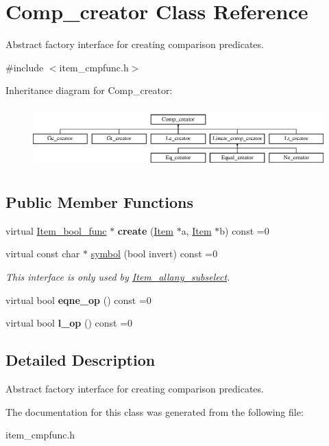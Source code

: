 \hypertarget{classComp__creator}{}\section{Comp\+\_\+creator Class Reference}
\label{classComp__creator}


Abstract factory interface for creating comparison predicates.  




{\ttfamily \#include $<$item\+\_\+cmpfunc.\+h$>$}

Inheritance diagram for Comp\+\_\+creator\+:\begin{figure}[H]
\begin{center}
\leavevmode
\includegraphics[height=2.382979cm]{classComp__creator}
\end{center}
\end{figure}
\subsection*{Public Member Functions}
\begin{DoxyCompactItemize}
\item 
\mbox{\label{classComp__creator_acb61e20da689aa1dde501a3748f96f61}} 
virtual \mbox{\hyperlink{classItem__bool__func}{Item\+\_\+bool\+\_\+func}} $\ast$ {\bfseries create} (\mbox{\hyperlink{classItem}{Item}} $\ast$a, \mbox{\hyperlink{classItem}{Item}} $\ast$b) const =0
\item 
\mbox{\label{classComp__creator_af037da69fa5142d6e70dafeea00da99f}} 
virtual const char $\ast$ \mbox{\hyperlink{classComp__creator_af037da69fa5142d6e70dafeea00da99f}{symbol}} (bool invert) const =0
\begin{DoxyCompactList}\small\item\em This interface is only used by \mbox{\hyperlink{classItem__allany__subselect}{Item\+\_\+allany\+\_\+subselect}}. \end{DoxyCompactList}\item 
\mbox{\label{classComp__creator_a74fcabc274ecbc3d6891838e39f8d085}} 
virtual bool {\bfseries eqne\+\_\+op} () const =0
\item 
\mbox{\label{classComp__creator_a5fd27293f28c1f24f1a314e91fbfd162}} 
virtual bool {\bfseries l\+\_\+op} () const =0
\end{DoxyCompactItemize}


\subsection{Detailed Description}
Abstract factory interface for creating comparison predicates. 

The documentation for this class was generated from the following file\+:\begin{DoxyCompactItemize}
\item 
item\+\_\+cmpfunc.\+h\end{DoxyCompactItemize}
